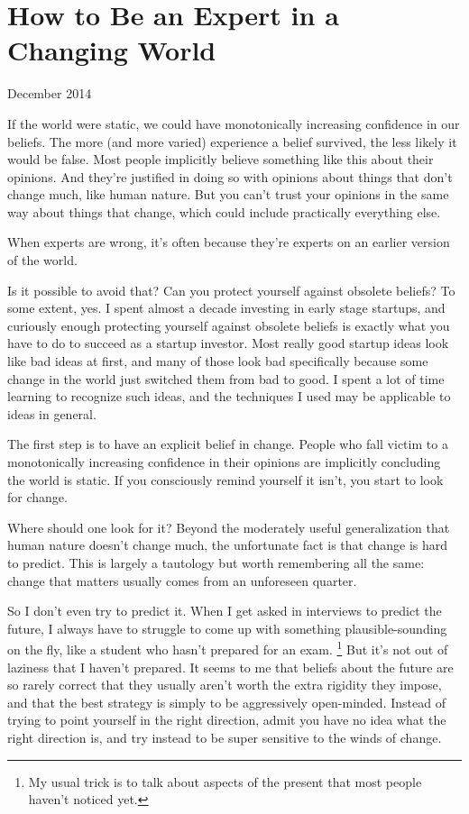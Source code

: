 \chapter{How to Be an Expert in a Changing World}

December 2014

If the world were static, we could have monotonically increasing
confidence in our beliefs. The more (and more varied) experience a
belief survived, the less likely it would be false. Most people
implicitly believe something like this about their opinions. And they're
justified in doing so with opinions about things that don't change much,
like human nature. But you can't trust your opinions in the same way
about things that change, which could include practically everything
else.

When experts are wrong, it's often because they're experts on an earlier
version of the world.

Is it possible to avoid that? Can you protect yourself against obsolete
beliefs? To some extent, yes. I spent almost a decade investing in early
stage startups, and curiously enough protecting yourself against
obsolete beliefs is exactly what you have to do to succeed as a startup
investor. Most really good startup ideas look like bad ideas at first,
and many of those look bad specifically because some change in the world
just switched them from bad to good. I spent a lot of time learning to
recognize such ideas, and the techniques I used may be applicable to
ideas in general.

The first step is to have an explicit belief in change. People who fall
victim to a monotonically increasing confidence in their opinions are
implicitly concluding the world is static. If you consciously remind
yourself it isn't, you start to look for change.

Where should one look for it? Beyond the moderately useful
generalization that human nature doesn't change much, the unfortunate
fact is that change is hard to predict. This is largely a tautology but
worth remembering all the same: change that matters usually comes from
an unforeseen quarter.

So I don't even try to predict it. When I get asked in interviews to
predict the future, I always have to struggle to come up with something
plausible-sounding on the fly, like a student who hasn't prepared for an
exam. \footnote{My usual trick is to talk about aspects of the present that most
people haven't noticed yet.} But it's not out of laziness that I
haven't prepared. It seems to me that beliefs about the future are so
rarely correct that they usually aren't worth the extra rigidity they
impose, and that the best strategy is simply to be aggressively
open-minded. Instead of trying to point yourself in the right direction,
admit you have no idea what the right direction is, and try instead to
be super sensitive to the winds of change.

